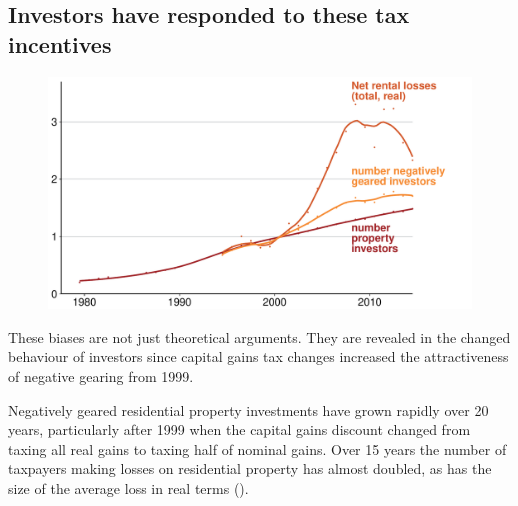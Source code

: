\subsection{Investors have responded to these tax incentives}
\begin{figure}
\label{fig:number-NG-and-net-losses-time-series}
\includegraphics[width=1.16\columnwidth]{CGT-NG-atlas/NG-over-time.pdf}
\end{figure}
These biases are not just theoretical arguments. 
They are revealed in the changed behaviour of investors since capital gains tax changes increased the attractiveness of negative gearing from 1999.

Negatively geared residential property investments have grown rapidly over 20 years, particularly after 1999 when the capital gains discount changed from taxing all real gains to taxing half of nominal gains. 
Over 15 years the number of taxpayers making losses on residential property has almost doubled, as has the size of the average loss in real terms ().  




